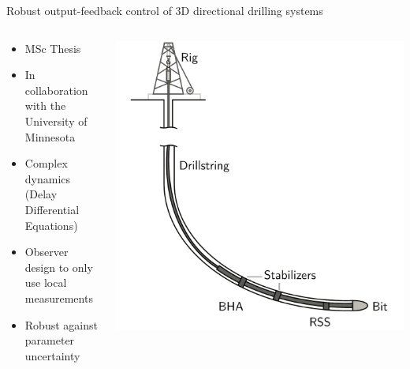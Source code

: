 \documentclass{beamer}
\begin{document}
\begin{frame}{Robust output-feedback control of 3D directional drilling systems}
	\begin{columns}
		\begin{column}{0.5\textwidth}
			\begin{itemize}
			\item MSc Thesis 
			\item In collaboration with the University of Minnesota
			\item Complex dynamics (Delay Differential Equations)
			\item Observer design to only use local measurements
			\item Robust against parameter uncertainty
			\end{itemize}
		\end{column}
		\begin{column}{0.5\textwidth}
			\includegraphics[width = 1\textwidth]{drillingsystem.pdf}
		\end{column}
	\end{columns}
\end{frame}

\end{document}
